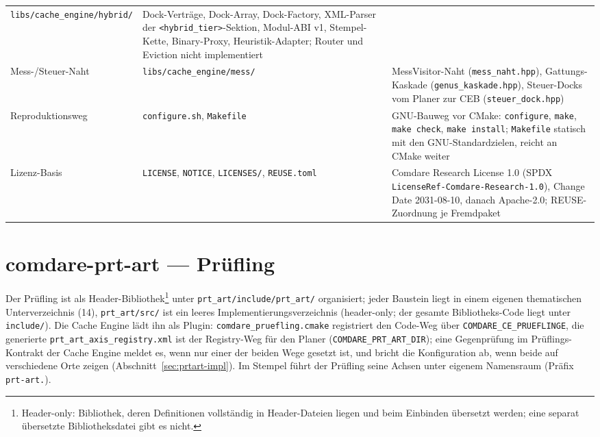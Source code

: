 {\begin{longtable}{@{}>{\raggedright\arraybackslash}p{}>{\raggedright\arraybackslash}p{}>{\raggedright\arraybackslash}p{}@{}}
\texttt{libs/\allowbreak{}cache\_engine/\allowbreak{}hybrid/} &
Dock-Verträge, Dock-Array, Dock-Factory, XML-Parser der \texttt{<hybrid\_tier>}-Sektion, Modul-ABI v1,
Stempel-Kette, Binary-Proxy, Heuristik-Adapter; Router und Eviction nicht implementiert \\
Mess-/Steuer-Naht &
\texttt{libs/\allowbreak{}cache\_engine/\allowbreak{}mess/} &
MessVisitor-Naht (\texttt{mess\_\allowbreak{}naht.hpp}), Gattungs-Kaskade
(\texttt{genus\_\allowbreak{}kaskade.hpp}), Steuer-Docks vom Planer zur CEB
(\texttt{steuer\_\allowbreak{}dock.hpp}) \\
Reproduktionsweg &
\texttt{configure.sh}, \texttt{Makefile} &
GNU-Bauweg vor CMake: \texttt{configure}, \texttt{make}, \texttt{make check}, \texttt{make install};
\texttt{Makefile} statisch mit den GNU-Standardzielen, reicht an CMake weiter \\
Lizenz-Basis &
\texttt{LICENSE}, \texttt{NOTICE}, \texttt{LICENSES/}, \texttt{REUSE.toml} &
Comdare Research License 1.0 (SPDX \texttt{LicenseRef-\allowbreak{}Comdare-\allowbreak{}Research-1.0}),
Change Date 2031-08-10, danach Apache-2.0; REUSE-Zuordnung je Fremdpaket \\
\end{longtable}
}

\section*{comdare-prt-art --- Prüfling}

Der Prüfling ist als Header-Bibliothek\footnote{Header-only: Bibliothek, deren Definitionen vollständig in
Header-Dateien liegen und beim Einbinden übersetzt werden; eine separat übersetzte Bibliotheksdatei gibt es
nicht.} unter \texttt{prt\_art/\allowbreak{}include/\allowbreak{}prt\_art/} organisiert; jeder Baustein
liegt in einem eigenen thematischen Unterverzeichnis (14), \texttt{prt\_art/src/} ist ein leeres
Implementierungsverzeichnis (header-only; der gesamte Bibliotheks-Code liegt unter \texttt{include/}). Die Cache Engine lädt ihn als Plugin: \texttt{comdare\_pruefling.cmake} registriert
den Code-Weg über \texttt{COMDARE\_CE\_PRUEFLINGE}, die generierte \texttt{prt\_art\_axis\_registry.xml} ist
der Registry-Weg für den Planer (\texttt{COMDARE\_PRT\_ART\_DIR}); eine Gegenprüfung im Prüflings-Kontrakt
der Cache Engine meldet es, wenn nur einer der beiden Wege gesetzt ist, und bricht die Konfiguration ab,
wenn beide auf verschiedene Orte zeigen (Abschnitt~\ref{sec:prtart-impl}). Im Stempel führt der Prüfling
seine Achsen unter eigenem Namensraum (Präfix \texttt{prt-art.}).


